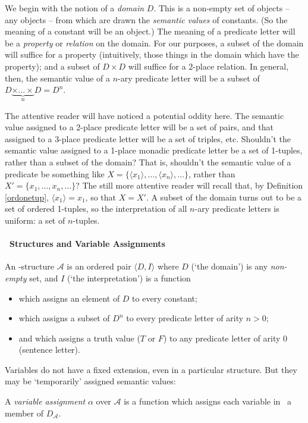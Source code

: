  We begin with the notion of a \emph{domain} $D$. This is a non-empty set of objects – any objects – from which are drawn the \emph{semantic values} of constants. (So the meaning of a constant will be an object.) The meaning of a predicate letter will be a \emph{property} or \emph{relation} on the domain. For our purposes, a subset of the domain will suffice for a property (intuitively, those  things in the domain which have the property); and a subset of $D\times D$ will suffice for a 2-place relation. In general, then, the semantic value of a $n$-ary predicate letter will be a subset of $D\underbrace{\times\ldots\times}_{n} D = D^{n}$.

 The attentive reader will have noticed a potential oddity here. The semantic value assigned to a 2-place predicate letter will be a set of pairs, and that assigned to a 3-place predicate letter will be a set of triples, etc. Shouldn't the semantic value assigned to a 1-place monadic predicate letter be a set of 1-tuples, rather than a subset of the domain? That is, shouldn't the semantic value of a predicate be something like $X=\{\langle x_{1} \rangle,…,\langle x_{n}\rangle,…\}$, rather than $X'=\{x_{1},…,x_{n},…\}$? The still more attentive reader will recall that, by Definition \ref{ordonetup}, $\langle x_{1}\rangle = x_{1}$, so that $X=X'$. A subset of the domain turns out to be a set of ordered 1-tuples, so the interpretation of all $n$-ary predicate letters is uniform: a set of $n$-tuples.


\paragraph{\ltwo\ Structures and Variable Assignments}

\begin{definition}
	An \ltwo-structure $\mathscr{A}$ is an ordered pair $\langle D, I\rangle$ where $D$ (`the domain') is any \emph{non-empty} set, and $I$ (`the interpretation') is a function \begin{itemize}
		\item which assigns an element of $D$ to every constant;
		\item which assigns a subset of $D^{n}$ to every predicate letter of arity $n>0$;
		\item and which assigns a truth value ($T$ or $F$) to any predicate letter of arity $0$ (sentence letter).
	\end{itemize}
\end{definition} Variables do not have a fixed extension, even in a particular structure. But they may be `temporarily' assigned semantic values: \begin{definition} A \emph{variable assignment} $\alpha$ over $\mathscr{A}$ is a function which assigns each variable in \ltwo\ a member of $D_{\!\mathscr{A}}$.
	\end{definition}

